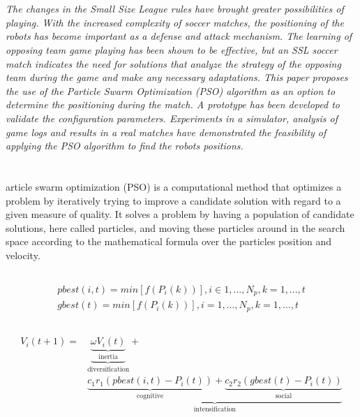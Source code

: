 \documentclass[a0,portrait]{sciposter}
\newcommand{\tituloA}[1]{\emph{\textbf{\color{white}{#1}}}}
\newcommand{\tituloB}[1]{\emph{\textbf{\color{blue}{#1}}}}
\renewenvironment{abstract}
{\section*{\color{white}{\abstractname}}\it}
{}
\begin{document}
\begin{multicols}{3}

\setlength{\parindent}{3em}

\begin{abstract}
    The changes in the Small Size League rules have brought greater possibilities of playing. With the increased complexity of soccer matches, the positioning of the robots has become important as a defense and attack mechanism. The learning of opposing team game playing has been shown to be effective, but an SSL soccer match indicates the need for solutions that analyze the strategy of the opposing team during the game and make any necessary adaptations. This paper proposes the use of the Particle Swarm Optimization (PSO) algorithm as an option to determine the positioning during the match. A prototype has been developed to validate the configuration parameters. Experiments in a simulator, analysis of game logs and results in a real matches have demonstrated the feasibility of applying the PSO algorithm to find the robots positions.
\end{abstract}

\section*{\tituloA{Particle Swarm Optimization}}
    article swarm optimization (PSO) is a computational method that optimizes a problem by iteratively trying to improve a candidate solution with regard to a given measure of quality. It solves a problem by having a population of candidate solutions, here called particles, and moving these particles around in the search space according to the mathematical formula over the particles position and velocity.


\subsection*{\tituloB{PSO pbest and gbest equation}}
    \[
        \begin{aligned}
    pbest(i,t) = min [ f(P_i(k))], i \in {1,...,N_p}, k=1,...,t 
    \\
    gbest(t) = min [ f(P_i(k))], i = 1,...,N_p,  k=1,...,t
    \end{aligned}
    \]

\subsection*{\tituloB{PSO Velocity equation}}
    \[
    \begin{aligned}
    V_i(t+1) =&\underbrace{\underbrace{\omega V_i(t)}_{ \textrm{inertia} }}_{\textrm{diversification}} +\\ 
    &\underbrace{\underbrace{c_1 r_1 ( pbest(i,t) - P_i(t) )}_{\textrm{cognitive}} + 
        \underbrace{c_2 r_2( gbest(t)-P_i(t) )}_{\textrm{social}}}_{\textrm{intensification}}
    \end{aligned}
    \]



\end{multicols}
\end{document}
